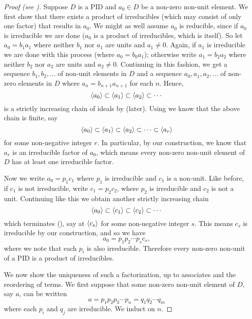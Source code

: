 \begin{proof}[Proof (see {\cite[Theorem 18.3]{gallian_2016}})]
    Suppose $D$ is a PID and $a_0 \in D$ be a non-zero non-unit element. We first show that there exists a product of irreducibles (which may consist of only one factor) that results in $a_0$. We might as well assume $a_0$ is reducible, since if $a_0$ is irreducible we are done ($a_0$ is a product of irreducibles, which is itself). So let $a_0 = b_1a_1$ where neither $b_1$ nor $a_1$ are units and $a_1 \neq 0$. Again, if $a_1$ is irreducible we are done with this process (where $a_0 = b_0a_1$); otherwise write $a_1 = b_2a_2$ where neither $b_2$ nor $a_2$ are units and $a_2 \neq 0$. Continuing in this fashion, we get a sequence $b_1,b_2,\dots$ of non-unit elements in $D$ and a sequence $a_0,a_1,a_2,\dots$ of non-zero elements in $D$ where $a_n = b_{n+1}a_{n+1}$ for each $n$. Hence,
    \[
        \left\langle a_0\right\rangle \subset \left\langle a_1\right\rangle \subset \left\langle a_2\right\rangle \subset \cdots
    \]
    is a strictly increasing chain of ideals by  (later). Using  we know that the above chain is finite, say
    \[
        \left\langle a_0\right\rangle \subset \left\langle a_1\right\rangle \subset \left\langle a_2\right\rangle \subset \cdots \subset \left\langle a_r\right\rangle
    \]
    for some non-negative integer $r$. In particular, by our construction, we know that $a_r$ is an irreducible factor of $a_0$, which means every non-zero non-unit element of $D$ has at least one irreducible factor.

    Now we write $a_0 = p_1c_1$ where $p_1$ is irreducible and $c_1$ is a non-unit. Like before, if $c_1$ is not irreducible, write $c_1 = p_2c_2$, where $p_2$ is irreducible and $c_2$ is not a unit. Continuing like this we obtain another strictly increasing chain
    \[
        \left\langle a_0\right\rangle \subset \left\langle c_1\right\rangle \subset \left\langle c_2\right\rangle \subset \cdots
    \]
    which terminates (), say at $\left\langle c_s\right\rangle$ for some non-negative integer $s$. This means $c_s$ is irreducible by our construction, and so we have
    \[
        a_0 = p_1p_2\cdots p_sc_s,
    \]
    where we note that each $p_i$ is also irreducible. Therefore every non-zero non-unit of a PID is a product of irreducibles.

    We now show the uniqueness of such a factorization, up to associates and the reordering of terms. We first suppose that some non-zero non-unit element of $D$, say $a$, can be written
    \[
        a = p_1p_2p_3\cdots p_n = q_1q_2 \cdots q_m
    \]
    where each $p_i$ and $q_j$ are irreducible. We induct on $n$.


\end{proof}
